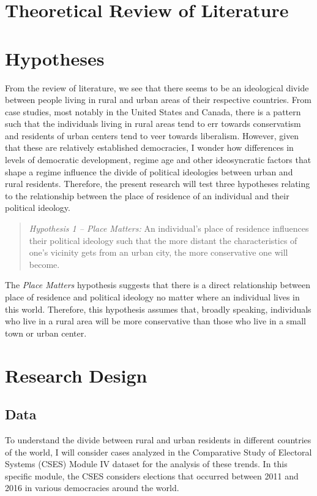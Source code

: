 \documentclass[12pt, titlepage]{article}
\newcommand\e{\emph}
\begin{document}
\section{Theoretical Review of Literature}


\section{Hypotheses}

From the review of literature, we see that there seems to be an ideological divide between people living in rural and urban areas of their respective countries. From case studies, most notably in the United States and Canada, there is a pattern such that the individuals living in rural areas tend to err towards conservatism and residents of urban centers tend to veer towards liberalism. However, given that these are relatively established democracies, I wonder how differences in levels of democratic development, regime age and other ideosyncratic factors that shape a regime influence the divide of political ideologies between urban and rural residents. Therefore, the present research will test three hypotheses relating to the relationship between the place of residence of an individual and their political ideology.

\begin{quote}
	\e {Hypothesis 1 -- Place Matters:} An individual's place of residence influences their political ideology such that the more distant the characteristics of one's vicinity gets from an urban city, the more conservative one will become.
\end{quote}

The \e{Place Matters} hypothesis suggests that there is a direct relationship between place of residence and political ideology no matter where an individual lives in this world. Therefore, this hypothesis assumes that, broadly speaking, individuals who live in a rural area will be more conservative than those who live in a small town or urban center. 

\section{Research Design}

\subsection{Data}

To understand the divide between rural and urban residents in different countries of the world, I will consider cases analyzed in the Comparative Study of Electoral Systems (CSES) Module IV dataset for the analysis of these trends. In this specific module, the CSES considers elections that occurred between 2011 and 2016 in various democracies around the world. 
\end{document}

